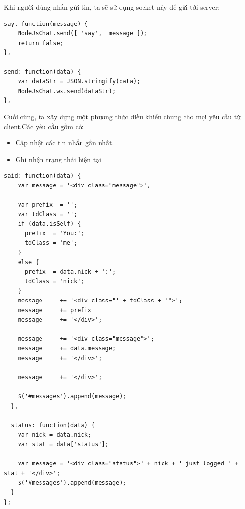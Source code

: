 Khi người dùng nhấn gửi tin, ta sẽ sử dụng socket này để gửi tới server:
	\begin{verbatim}
say: function(message) {
	NodeJsChat.send([ 'say',  message ]);
    return false;
},

send: function(data) {
	var dataStr = JSON.stringify(data);
    NodeJsChat.ws.send(dataStr);
},
	\end{verbatim}

Cuối cùng, ta xây dựng một phương thức điều khiển chung cho mọi yêu cầu từ client.Các yêu cầu gồm có:
	\begin{itemize}
		\item Cập nhật các tin nhắn gần nhất.
		\item Ghi nhận trạng thái hiện tại.
	\end{itemize}

	\begin{verbatim}
said: function(data) {
	var message = '<div class="message">';

    var prefix  = '';
    var tdClass = '';
    if (data.isSelf) {
      prefix  = 'You:';
      tdClass = 'me';
    }
    else {
      prefix  = data.nick + ':';
      tdClass = 'nick';
    }
    message     += '<div class="' + tdClass + '">';
    message     += prefix
    message     += '</div>';

    message     += '<div class="message">';
    message     += data.message;
    message     += '</div>';

    message     += '</div>';

    $('#messages').append(message);
  },

  status: function(data) {
    var nick = data.nick;
    var stat = data['status'];

    var message = '<div class="status">' + nick + ' just logged ' + stat + '</div>';
    $('#messages').append(message);
  }
};
	\end{verbatim}
